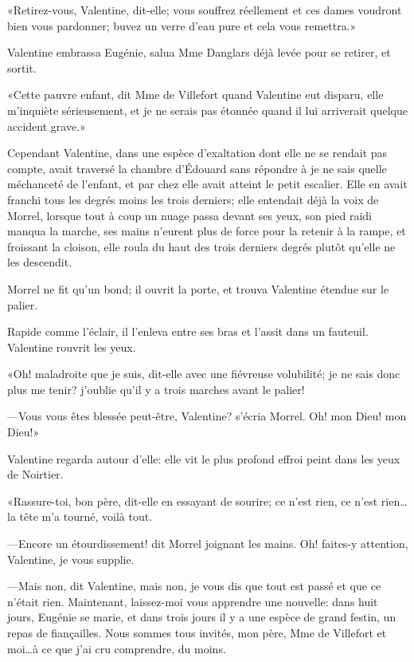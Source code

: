 «Retirez-vous, Valentine, dit-elle; vous souffrez réellement et ces dames voudront bien vous pardonner; buvez un verre d'eau pure et cela vous remettra.» 

Valentine embrassa Eugénie, salua Mme Danglars déjà levée pour se retirer, et sortit. 

«Cette pauvre enfant, dit Mme de Villefort quand Valentine eut disparu, elle m'inquiète sérieusement, et je ne serais pas étonnée quand il lui arriverait quelque accident grave.» 

Cependant Valentine, dans une espèce d'exaltation dont elle ne se rendait pas compte, avait traversé la chambre d'Édouard sans répondre à je ne sais quelle méchanceté de l'enfant, et par chez elle avait atteint le petit escalier. Elle en avait franchi tous les degrés moins les trois derniers; elle entendait déjà la voix de Morrel, lorsque tout à coup un nuage passa devant ses yeux, son pied raidi manqua la marche, ses mains n'eurent plus de force pour la retenir à la rampe, et froissant la cloison, elle roula du haut des trois derniers degrés plutôt qu'elle ne les descendit. 

Morrel ne fit qu'un bond; il ouvrit la porte, et trouva Valentine étendue sur le palier. 

Rapide comme l'éclair, il l'enleva entre ses bras et l'assit dans un fauteuil. Valentine rouvrit les yeux. 

«Oh! maladroite que je suis, dit-elle avec une fiévreuse volubilité; je ne sais donc plus me tenir? j'oublie qu'il y a trois marches avant le palier! 

—Vous vous êtes blessée peut-être, Valentine? s'écria Morrel. Oh! mon Dieu! mon Dieu!» 

Valentine regarda autour d'elle: elle vit le plus profond effroi peint dans les yeux de Noirtier. 

«Rassure-toi, bon père, dit-elle en essayant de sourire; ce n'est rien, ce n'est rien\dots la tête m'a tourné, voilà tout. 

—Encore un étourdissement! dit Morrel joignant les mains. Oh! faites-y attention, Valentine, je vous supplie. 

—Mais non, dit Valentine, mais non, je vous dis que tout est passé et que ce n'était rien. Maintenant, laissez-moi vous apprendre une nouvelle: dans huit jours, Eugénie se marie, et dans trois jours il y a une espèce de grand festin, un repas de fiançailles. Nous sommes tous invités, mon père, Mme de Villefort et moi\dots à ce que j'ai cru comprendre, du moins. 

